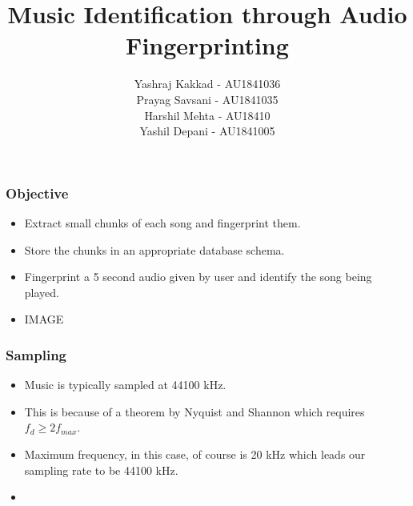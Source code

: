 \documentclass{beamer}
\author{Yashraj Kakkad - AU1841036 \\
        Prayag Savsani - AU1841035 \\
        Harshil Mehta - AU18410 \\
        Yashil Depani - AU1841005}
\title{Music Identification through Audio Fingerprinting}
\begin{document}
\maketitle

\begin{frame}[t] %
\frametitle{Objective}
\begin{itemize}
    \item Extract small chunks of each song and fingerprint them.
    \item Store the chunks in an appropriate database schema. 
    \item Fingerprint a 5 second audio given by user and identify the song being played.
    \item IMAGE
\end{itemize}
\end{frame}

\begin{frame}[t]
\frametitle{Sampling}
\begin{itemize}
    \item Music is typically sampled at 44100 kHz.
    \item This is because of a theorem by Nyquist and Shannon which requires \(f_{d} \ge 2f_{max}\).
    \item Maximum frequency, in this case, of course is 20 kHz which leads our sampling rate to be 44100 kHz.
    \item 
\end{itemize}        
\end{frame}
\end{document}
